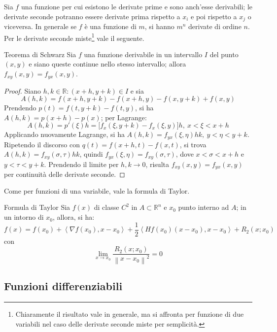 \documentclass[10pt, a4paper]{scrartcl}
\theoremstyle{definition}
\numberwithin{esempio}{section}
\theoremstyle{definition}
\numberwithin{obs}{section}
\numberwithin{nota}{section}
\numberwithin{equation}{subsection}
\begin{document}
Sia $f$ una funzione per cui esistono le derivate prime e sono anch'esse derivabili; le derivate seconde potranno essere derivate prima rispetto a $x_i$ e poi rispetto a $x_j$ o viceversa. In generale se $f$ \`e una funzione di $m$, si hanno $m^n$ derivate di ordine $n$. Per le derivate seconde miste\footnote{Chiaramente il risultato vale in generale, ma si affronta per funzione di due variabili nel caso delle derivate seconde miste per semplicit\`a.} vale il seguente.
\begin{teorema}
	{Teorema di Schwarz}{}
	Sia $f$ una funzione derivabile in un intervallo $I$ del punto $(x,y)$ e siano queste continue nello stesso intervallo; allora $f_{xy} (x,y) = f_{yx} (x,y)$.
	\begin{proof}
		Siano $h,k \in \mathbb{R}:(x+h,y+k) \in I$ e sia
		\[
		A(h,k) = f(x+h,y+k) - f(x+h,y) - f(x,y+k) + f(x,y)
		\] 
		Prendendo $p(t) = f(t,y+k) - f(t,y)$, si ha $A(h,k) = p(x+h) - p(x)$; per Lagrange:
		\[
			A(h,k) = p'(\xi ) h = \big[f_x(\xi ,y+k) - f_x(\xi ,y)\big]h ,\ x< \xi <x+h
		\] 
		Applicando nuovamente Lagrange, si ha $A(h,k) = f_{yx} (\xi, \eta) hk, \ y<\eta < y+k$. Ripetendo il discorso con $q(t) = f(x+h,t) - f(x,t)$, si trova $A(h,k) = f_{xy} (\sigma ,\tau ) hk$, quindi $f_{yx}(\xi ,\eta) =f_{xy} (\sigma ,\tau ) $, dove $x<\sigma <x+h$ e $y<\tau <y+k$. Prendendo il limite per $h,k\to 0$, risulta $f_{xy} (x,y) = f_{yx} (x,y)$ per continuit\`a delle derivate seconde.
		
	\end{proof}
\end{teorema}
\noindent Come per funzioni di una variabile, vale la formula di Taylor.
\begin{teorema}
	{Formula di Taylor}{}
	Sia $f(x)$ di classe $C^2$ in $A \subset \mathbb{R}^n$ e $x_0$ punto interno ad $A$; in un intorno di $x_0$, allora, si ha:
	\begin{equation}
		f(x) = f(x_0) + \left\langle \nabla f(x_0), x-x_0 \right\rangle + \frac{1}{2} \left\langle Hf(x_0) (x-x_0), x-x_0 \right\rangle + R_2(x;x_0)
	\end{equation}
	con 
	\[
	\lim_{x \to x_0} \frac{R_2(x;x_0)}{\left\lVert x-x_0 \right\rVert ^2} = 0
	\] 
	
\end{teorema}

\subsection{Funzioni differenziabili}
\end{document}
